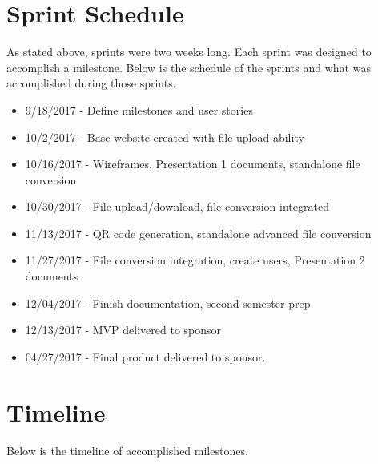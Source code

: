 \section{Sprint Schedule}
As stated above, sprints were two weeks long. Each sprint was designed to accomplish a milestone. 
Below is the schedule of the sprints and what was accomplished during those sprints.

\begin{itemize}
	\item 9/18/2017   - Define milestones and user stories

	\item 10/2/2017   - Base website created with file upload ability
	
	\item 10/16/2017  - Wireframes, Presentation 1 documents, standalone file conversion
	
	\item 10/30/2017  - File upload/download, file conversion integrated
	
	\item 11/13/2017  - QR code generation, standalone advanced file conversion 
	
	\item 11/27/2017  - File conversion integration, create users, Presentation 2 documents
	
	\item 12/04/2017  - Finish documentation, second semester prep
	
	\item 12/13/2017  - MVP delivered to sponsor
	
	\item 04/27/2017  - Final product delivered to sponsor.
\end{itemize}

\section{Timeline}
Below is the timeline of accomplished milestones.

